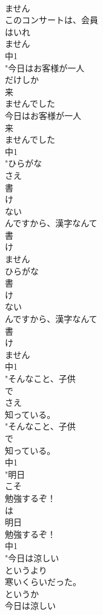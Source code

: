 \documentclass[8pt]{extreport}
\begin{document}
\begin{CJK}{UTF8}{min}
\\	ません
\\	このコンサートは、会員
\\	はいれ
\\	ません
\\	中1
\\	"今日はお客様が一人
\\	だけしか
\\	来
\\	ませんでした
\\	今日はお客様が一人
\\	来
\\	ませんでした
\\	中1
\\	"ひらがな
\\	さえ
\\	書
\\	け
\\	ない
\\	んですから、漢字なんて
\\	書
\\	け
\\	ません
\\	ひらがな
\\	書
\\	け
\\	ない
\\	んですから、漢字なんて
\\	書
\\	け
\\	ません
\\	中1
\\	"そんなこと、子供
\\	で
\\	さえ
\\	知っている。
\\	"そんなこと、子供
\\	で
\\	知っている。
\\	中1
\\	"明日
\\	こそ
\\	勉強するぞ！
\\	は 
\\	明日
\\	勉強するぞ！
\\	中1
\\	"今日は涼しい
\\	というより
\\	寒いくらいだった。
\\	というか
\\	今日は涼しい

\end{CJK}
\end{document}
